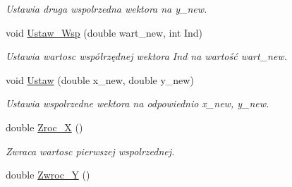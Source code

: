 \begin{DoxyCompactItemize}
\begin{DoxyCompactList}\small\item\em Ustawia druga wspolrzedna wektora na y\+\_\+new. \end{DoxyCompactList}\item 
void \hyperlink{class_wektor2_d_a9b3a4e9dc8e3697fbca786faf029c6c1}{Ustaw\+\_\+\+Wsp} (double wart\+\_\+new, int Ind)
\begin{DoxyCompactList}\small\item\em Ustawia wartosc współrzędnej wektora Ind na wartość wart\+\_\+new. \end{DoxyCompactList}\item 
\hypertarget{class_wektor2_d_a33026b3a205d6e3f66c25c2e6e241a71}{void \hyperlink{class_wektor2_d_a33026b3a205d6e3f66c25c2e6e241a71}{Ustaw} (double x\+\_\+new, double y\+\_\+new)}\label{class_wektor2_d_a33026b3a205d6e3f66c25c2e6e241a71}

\begin{DoxyCompactList}\small\item\em Ustawia wspolrzedne wektora na odpowiednio x\+\_\+new, y\+\_\+new. \end{DoxyCompactList}\item 
\hypertarget{class_wektor2_d_aa52f09def60840859082e2c8728928f7}{double \hyperlink{class_wektor2_d_aa52f09def60840859082e2c8728928f7}{Zroc\+\_\+\+X} ()}\label{class_wektor2_d_aa52f09def60840859082e2c8728928f7}

\begin{DoxyCompactList}\small\item\em Zwraca wartosc pierwszej wspolrzednej. \end{DoxyCompactList}\item 
\hypertarget{class_wektor2_d_ad87d085bf5865039317476080b3cda69}{double \hyperlink{class_wektor2_d_ad87d085bf5865039317476080b3cda69}{Zwroc\+\_\+\+Y} ()}\label{class_wektor2_d_ad87d085bf5865039317476080b3cda69}


\end{DoxyCompactItemize}
